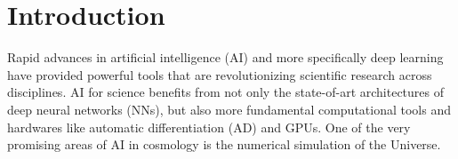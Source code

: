 \documentclass[modern, trackchanges, dvipsnames]{aastex631}
\begin{document}
\section{Introduction}
\label{sec:intro}

Rapid advances in artificial intelligence (AI) and more specifically
deep learning have provided powerful tools that are revolutionizing
scientific research across disciplines.
AI for science benefits from not only the state-of-art architectures of
deep neural networks (NNs), but also more fundamental computational
tools and hardwares like automatic differentiation (AD) and GPUs.
One of the very promising areas of AI in cosmology is the numerical
simulation of the Universe.

\end{document}
